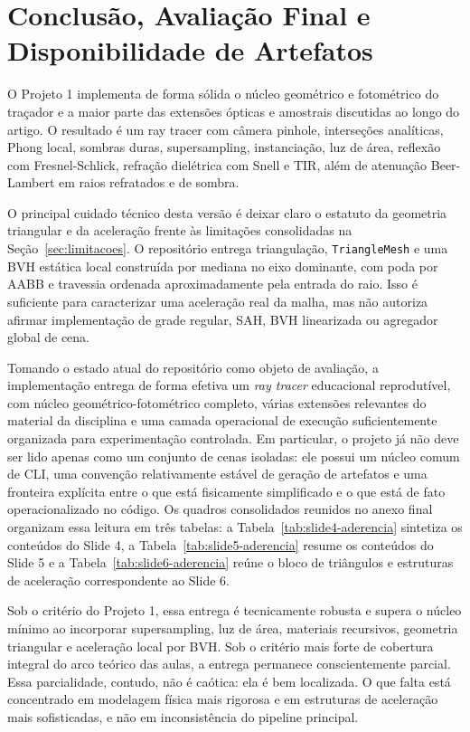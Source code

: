 \documentclass[portuguese]{sbcreviews-2025}%
\begin{document}
\section{Conclusão, Avaliação Final e Disponibilidade de Artefatos}
\label{sec:conclusao}

O Projeto 1 implementa de forma sólida o núcleo geométrico e fotométrico do traçador e a maior parte das extensões ópticas e amostrais discutidas ao longo do artigo. O resultado é um ray tracer com câmera pinhole, interseções analíticas, Phong local, sombras duras, supersampling, instanciação, luz de área, reflexão com Fresnel-Schlick, refração dielétrica com Snell e TIR, além de atenuação Beer-Lambert em raios refratados e de sombra.

O principal cuidado técnico desta versão é deixar claro o estatuto da geometria triangular e da aceleração frente às limitações consolidadas na Seção~\ref{sec:limitacoes}. O repositório entrega triangulação, \texttt{TriangleMesh} e uma BVH estática local construída por mediana no eixo dominante, com poda por AABB e travessia ordenada aproximadamente pela entrada do raio. Isso é suficiente para caracterizar uma aceleração real da malha, mas não autoriza afirmar implementação de grade regular, SAH, BVH linearizada ou agregador global de cena.

 Tomando o estado atual do repositório como objeto de avaliação, a implementação entrega de forma efetiva um \emph{ray tracer} educacional reprodutível, com núcleo geométrico-fotométrico completo, várias extensões relevantes do material da disciplina e uma camada operacional de execução suficientemente organizada para experimentação controlada. Em particular, o projeto já não deve ser lido apenas como um conjunto de cenas isoladas: ele possui um núcleo comum de CLI, uma convenção relativamente estável de geração de artefatos e uma fronteira explícita entre o que está fisicamente simplificado e o que está de fato operacionalizado no código. Os quadros consolidados reunidos no anexo final organizam essa leitura em três tabelas: a Tabela~\ref{tab:slide4-aderencia} sintetiza os conteúdos do Slide 4, a Tabela~\ref{tab:slide5-aderencia} resume os conteúdos do Slide 5 e a Tabela~\ref{tab:slide6-aderencia} reúne o bloco de triângulos e estruturas de aceleração correspondente ao Slide 6.

Sob o critério do Projeto 1, essa entrega é tecnicamente robusta e supera o núcleo mínimo ao incorporar supersampling, luz de área, materiais recursivos, geometria triangular e aceleração local por BVH. Sob o critério mais forte de cobertura integral do arco teórico das aulas, a entrega permanece conscientemente parcial. Essa parcialidade, contudo, não é caótica: ela é bem localizada. O que falta está concentrado em modelagem física mais rigorosa e em estruturas de aceleração mais sofisticadas, e não em inconsistência do pipeline principal.
\end{document}
